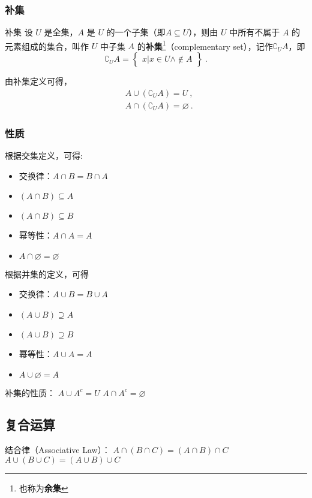 \subsubsection{补集}
\begin{definition}{补集}
设 $U$ 是全集，$A$ 是 $U$ 的一个子集（即$A\subseteq U$），则由 $U$ 中所有不属于 $A$ 的元素组成的集合，叫作 $U$ 中子集 $A$ 的\textbf{补集}\footnote{也称为\textbf{余集}}（complementary set），记作$\complement_UA$，即
\begin{equation}
\complement_UA = \begin{Bmatrix}x|x\in U \wedge \notin A\end{Bmatrix}~.
\end{equation}
\end{definition}

由补集定义可得，
\begin{equation}
\begin{aligned}
&A\cup (\complement_UA) = U~, \\
&A\cap (\complement_UA) = \varnothing~.
\end{aligned}
\end{equation}

\subsubsection{性质}

根据交集定义，可得:
\begin{itemize}
\item 交换律：$A\cap B = B\cap A$
\item $(A\cap B) \subseteq A$
\item $(A\cap B) \subseteq B$
\item 幂等性：$A\cap A = A$
\item $A\cap \varnothing = \varnothing$
\end{itemize}

根据并集的定义，可得
\begin{itemize}
\item 交换律：$A\cup B = B\cup A$
\item $(A\cup B) \supseteq A$
\item $(A\cup B) \supseteq B$
\item 幂等性：$A\cup A = A$
\item $A\cup \varnothing = A$
\end{itemize}

补集的性质：
$ A \cup A^c = U $
$A \cap A^c = \varnothing$

\subsection{复合运算}
结合律（Associative Law）：
$ A \cap (B \cap C) = (A \cap B) \cap C$ 
$ A \cup (B \cup C) = (A \cup B) \cup C$

